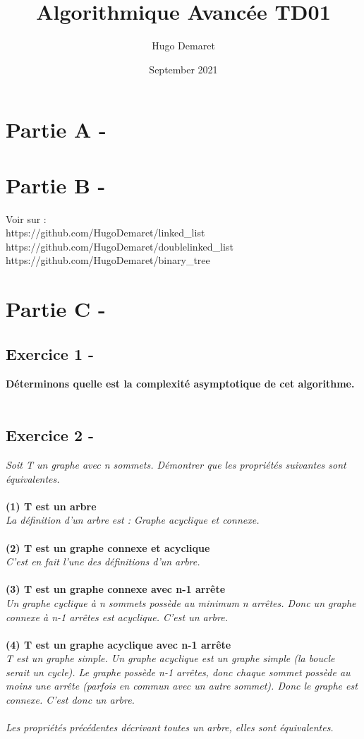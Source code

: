 \documentclass{article}
\title{Algorithmique Avancée TD01}
\author{Hugo Demaret}
\date{September 2021}
\begin{document}
\maketitle
\section*{Partie A -}
\section*{Partie B -}
Voir sur :\\
https://github.com/HugoDemaret/linked\_list\\
https://github.com/HugoDemaret/doublelinked\_list\\
https://github.com/HugoDemaret/binary\_tree\\

\section*{Partie C -}
\subsection*{Exercice 1 -}
\textbf{Déterminons quelle est la complexité asymptotique de cet algorithme.}\\\\
\subsection*{Exercice 2 -}
\textit{Soit T un graphe avec n sommets. Démontrer que les propriétés suivantes sont équivalentes.}\\\\
\textbf{(1) T est un arbre}\\
\textit{La définition d'un arbre est : Graphe acyclique et connexe.}\\\\
\textbf{(2) T est un graphe connexe et acyclique}\\
\textit{C'est en fait l'une des définitions d'un arbre.}\\\\
\textbf{(3) T est un graphe connexe avec n-1 arrête}\\
\textit{Un graphe cyclique à n sommets possède au minimum n arrêtes. Donc un graphe connexe à n-1 arrêtes est acyclique. C'est un arbre.}\\\\
\textbf{(4) T est un graphe acyclique avec n-1 arrête}\\
\textit{T est un graphe simple. Un graphe acyclique est un graphe simple (la boucle serait un cycle). Le graphe possède n-1 arrêtes, donc chaque sommet possède au moins une arrête (parfois en commun avec un autre sommet). Donc le graphe est connexe. C'est donc un arbre.}\\\\
\textit{Les propriétés précédentes décrivant toutes un arbre, elles sont équivalentes.}\\\\
\end{document}
